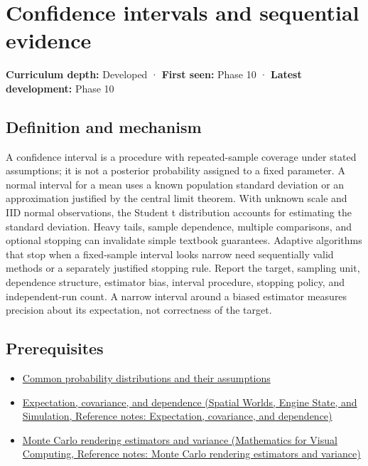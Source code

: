 \hypertarget{appendix-c83016554b1e}{}\label{referencestart:appendix-c83016554b1e}
\section{Confidence intervals and sequential evidence}\label{appendix-c83016554b1e-confidence-intervals-and-sequential-evidence}

\textbf{Curriculum depth:} Developed · \textbf{First seen:} Phase 10 · \textbf{Latest development:} Phase 10

\begin{allmightroledefinition}

\subsection{Definition and mechanism}\label{appendix-c83016554b1e-definition-and-mechanism}

A confidence interval is a procedure with repeated-sample coverage under stated assumptions; it is not a posterior probability assigned to a fixed parameter. A normal interval for a mean uses a known population standard deviation or an approximation justified by the central limit theorem. With unknown scale and IID normal observations, the Student t distribution accounts for estimating the standard deviation. Heavy tails, sample dependence, multiple comparisons, and optional stopping can invalidate simple textbook guarantees. Adaptive algorithms that stop when a fixed-sample interval looks narrow need sequentially valid methods or a separately justified stopping rule. Report the target, sampling unit, dependence structure, estimator bias, interval procedure, stopping policy, and independent-run count. A narrow interval around a biased estimator measures precision about its expectation, not correctness of the target.

\end{allmightroledefinition}

\subsection{Prerequisites}\label{appendix-c83016554b1e-prerequisites}

\begin{itemize}
\tightlist
\item
  \hyperref[appendix-a2360b435383]{Common probability distributions and their assumptions}
\item
  \href{../05-Spatial-Worlds-Engine-State-and-Simulation/main.pdf\#nameddest=appendix-54c383df9992}{Expectation, covariance, and dependence (Spatial Worlds, Engine State, and Simulation, Reference notes: Expectation, covariance, and dependence)}
\item
  \href{../02-Mathematics-for-Visual-Computing/main.pdf\#nameddest=appendix-031e02bf28af}{Monte Carlo rendering estimators and variance (Mathematics for Visual Computing, Reference notes: Monte Carlo rendering estimators and variance)}
\end{itemize}

